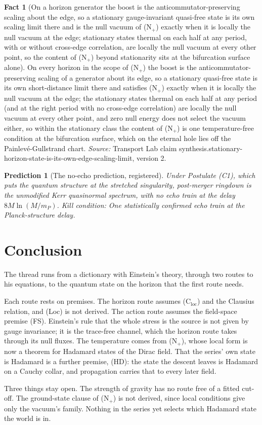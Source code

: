 \documentclass[11pt]{article}
\newtheorem{prediction}[theorem]{Prediction}
\theoremstyle{definition}
\newtheorem{fact}[theorem]{Fact}
\theoremstyle{plain}
\begin{document}
\begin{fact}[On a horizon generator the boost is the anticommutator-preserving scaling about the edge, so a stationary gauge-invariant quasi-free state is its own scaling limit there and is the null vacuum of (N$_{+}$) exactly when it is locally the null vacuum at the edge; stationary states thermal on each half at any period, with or without cross-edge correlation, are locally the null vacuum at every other point, so the content of (N$_{+}$) beyond stationarity sits at the bifurcation surface alone]\label{c:synthesis.stationary-horizon-state-is-its-own-edge-scaling-limit}
On every horizon in the scope of (N$_{+}$) the boost is the anticommutator-preserving scaling of a generator about its edge, so a stationary quasi-free state is its own short-distance limit there and satisfies (N$_{+}$) exactly when it is locally the null vacuum at the edge; the stationary states thermal on each half at any period (and at the right period with no cross-edge correlation) are locally the null vacuum at every other point, and zero null energy does not select the vacuum either, so within the stationary class the content of (N$_{+}$) is one temperature-free condition at the bifurcation surface, which on the eternal hole lies off the Painlev\'e-Gullstrand chart.
\emph{Source:} Transport Lab claim synthesis.stationary-horizon-state-is-its-own-edge-scaling-limit, version 2.
\end{fact}

\begin{prediction}[The no-echo prediction, registered]\label{c:scrambling.no-echo-prediction-registered}
Under Postulate (C1), which puts the quantum structure at the stretched singularity, post-merger ringdown is the unmodified Kerr quasinormal spectrum, with no echo train at the delay $8M\ln(M/m_P)$.
\emph{Kill condition:} One statistically confirmed echo train at the Planck-structure delay.
\end{prediction}

\section*{Conclusion}
The thread runs from a dictionary with Einstein's theory, through two routes to his equations, to the quantum state on the horizon that the first route needs.

Each route rests on premises. The horizon route assumes (C$_{\mathrm{loc}}$) and the Clausius relation, and (Loc) is not derived. The action route assumes the field-space premise (FS). Einstein's rule that the whole stress is the source is not given by gauge invariance; it is the trace-free channel, which the horizon route takes through its null fluxes. The temperature comes from (N$_{+}$), whose local form is now a theorem for Hadamard states of the Dirac field. That the series' own state is Hadamard is a further premise, (HD): the state the descent leaves is Hadamard on a Cauchy collar, and propagation carries that to every later field.

Three things stay open. The strength of gravity has no route free of a fitted cut-off. The ground-state clause of (N$_{+}$) is not derived, since local conditions give only the vacuum's family. Nothing in the series yet selects which Hadamard state the world is in.
\end{document}
